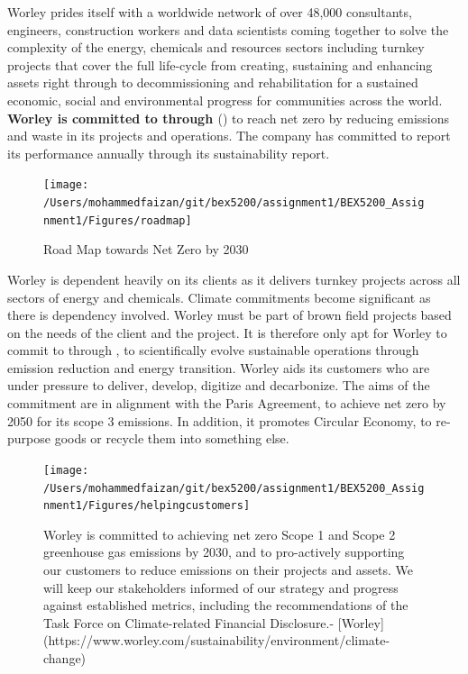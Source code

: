 \documentclass[11pt,a4paper,]{article}
\begin{document}
Worley prides itself with a worldwide network of over 48,000 consultants, engineers, construction workers and data scientists coming together to solve the complexity of the energy, chemicals and resources sectors including turnkey projects that cover the full life-cycle from creating, sustaining and enhancing assets right through to decommissioning and rehabilitation for a sustained economic, social and environmental progress for communities across the world. \textbf{Worley is committed to \textcite{businessambition} through \textcite{aboutsbti}}(\textcite{sciencebasedtargets}) to reach net zero by reducing emissions and waste in its projects and operations. The company has committed to report its performance annually through its sustainability report.

\begin{figure}

{\centering \texttt{[image: /Users/mohammedfaizan/git/bex5200/assignment1/BEX5200\_Assignment1/Figures/roadmap]} 

}

\caption{Road Map towards Net Zero by 2030}\label{fig:roadmap}
\end{figure}

Worley is dependent heavily on its clients as it delivers turnkey projects across all sectors of energy and chemicals. Climate commitments become significant as there is dependency involved. Worley must be part of brown field projects based on the needs of the client and the project. It is therefore only apt for Worley to commit to \textcite{businessambition} through \textcite{aboutsbti}, to scientifically evolve sustainable operations through emission reduction and energy transition. Worley aids its customers who are under pressure to deliver, develop, digitize and decarbonize. The aims of the commitment are in alignment with the Paris Agreement, to achieve net zero by 2050 for its scope 3 emissions. In addition, it promotes Circular Economy, to re-purpose goods or recycle them into something else.

\begin{figure}

{\centering \texttt{[image: /Users/mohammedfaizan/git/bex5200/assignment1/BEX5200\_Assignment1/Figures/helpingcustomers]} 

}

\caption{Worley is committed to achieving net zero Scope 1 and Scope 2 greenhouse gas emissions by 2030, and to pro-actively supporting our customers to reduce emissions on their projects and assets. We will keep our stakeholders informed of our strategy and progress against established metrics, including the recommendations of the Task Force on Climate-related Financial Disclosure.- [Worley](https://www.worley.com/sustainability/environment/climate-change)}\label{fig:helpingcustomers}
\end{figure}
\end{document}
